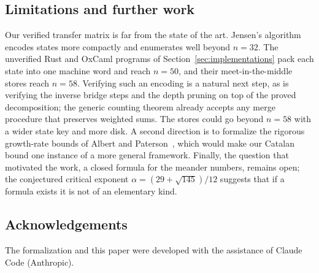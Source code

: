 \documentclass[11pt]{amsart}
\theoremstyle{definition}
\theoremstyle{remark}
\begin{document}
\subsection{Limitations and further work}
Our verified transfer matrix is far from the state of the art. Jensen's
algorithm~\cite{jensen00} encodes states more compactly and enumerates well beyond $n=32$. The
unverified Rust and OxCaml programs of Section~\ref{sec:implementations} pack each state into
one machine word and reach $n = 50$, and their meet-in-the-middle stores reach $n = 58$.
Verifying such an encoding is a natural next step, as is verifying the inverse bridge steps
and the depth pruning on top of the proved decomposition; the generic counting theorem already
accepts any merge procedure that preserves weighted sums. The stores could go beyond $n = 58$
with a wider state key and more disk. A second direction is to formalize the rigorous growth-rate bounds of
Albert and Paterson~\cite{albert-paterson}, which would make our Catalan bound one instance of
a more general framework. Finally, the question that motivated the work, a closed formula for
the meander numbers, remains open; the conjectured critical exponent
$\alpha = (29+\sqrt{145})/12$ suggests that if a formula exists it is not of an elementary kind.

\subsection*{Acknowledgements}
The formalization and this paper were developed with the assistance of Claude Code (Anthropic).
\end{document}

